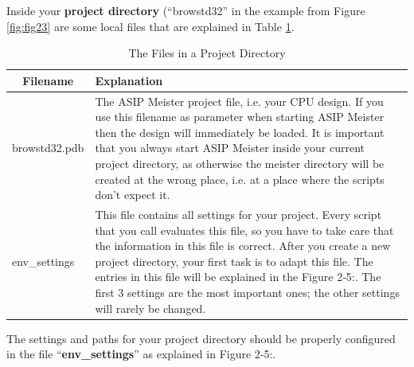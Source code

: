 Inside your \textbf{project directory} (``browstd32'' in the example
from Figure \ref{fig:fig23} are some local files that
are explained in Table \ref{fig:fig24}.
\begin{table}[!htb]
	\centering
	\begin{tabular}{|l|p{12cm}|}
		\hline
		\multicolumn{1}{|c|}{\textbf{Filename}} & \textbf{Explanation}                                                               \\ \hline
		browstd32.pdb & The ASIP Meister project file, i.e. your CPU design. If
		you use this filename as parameter when starting ASIP Meister then the
		design will immediately be loaded. It is important that you always start
		ASIP Meister inside your current project directory, as otherwise the
		meister directory will be created at the wrong place, i.e. at a place
		where the scripts don't expect it.
		\\ \hline
		env\_settings & This file contains all settings for your project. Every
		script that you call evaluates this file, so you have to take care that
		the information in this file is correct. After you create a new project
		directory, your first task is to adapt this file. The entries in this
		file will be explained in the Figure 2‑5:. The first 3 settings are the
		most important ones; the other settings will rarely be
		changed.
		\\ \hline
	\end{tabular}
	\caption{The Files in a Project Directory}
	\label{fig:fig24}
\end{table}
The settings and paths for your project directory should be properly
configured in the file ``\textbf{env\_settings}'' as explained in Figure
2‑5:.
